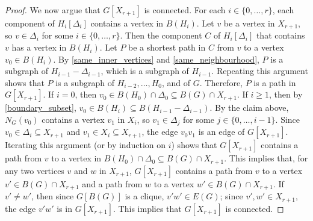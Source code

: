 \documentclass{patmorin}
\begin{document}
\begin{proof}
  We now argue that $G[X_{r+1}]$ is connected.  For each $i\in\{0,\ldots,r\}$, each component of $H_i[\Delta_i]$ contains a vertex in $B(H_i)$. Let $v$ be a vertex in $X_{r+1}$, so $v\in \Delta_i$ for some $i\in\{0,\ldots,r\}$.  Then the component $C$ of $H_i[\Delta_i]$ that contains $v$ has a vertex in $B(H_i)$.  Let $P$ be a shortest path in $C$ from $v$ to a vertex $v_0\in B(H_i)$. By \ref{same_inner_vertices} and \ref{same_neighbourhood}, $P$ is a subgraph of $H_{i-1}-\Delta_{i-1}$, which is a subgraph of $H_{i-1}$. Repeating this argument shows that $P$ is a subgraph of $H_{i-2},\ldots,H_0$, and of $G$.  Therefore, $P$ is a path in $G[X_{r+1}]$.  If $i=0$, then $v_0\in B(H_0)\cap \Delta_0 \subseteq B(G)\cap X_{r+1}$.  If $i\ge 1$, then by \ref{boundary_subset}, $v_0\in B(H_i)\subseteq B(H_{i-1}-\Delta_{i-1})$. By the claim above, $N_G(v_0)$ contains a vertex $v_1$ in $X_i$, so $v_1\in \Delta_j$ for some $j\in\{0,\ldots,i-1\}$. Since $v_0\in\Delta_i\subseteq X_{r+1}$ and $v_1\in X_i\subseteq X_{r+1}$, the edge $v_0v_1$ is an edge of $G[X_{r+1}]$. Iterating this argument (or by induction on $i$) shows that $G[X_{r+1}]$ contains a path from $v$ to a vertex in $B(H_0)\cap \Delta_0 \subseteq B(G)\cap X_{r+1}$.  This implies that, for any two vertices $v$ and $w$ in $X_{r+1}$, $G[X_{r+1}]$ contains a path from $v$ to a vertex $v'\in B(G)\cap X_{r+1}$ and a path from $w$ to a vertex $w'\in B(G)\cap X_{r+1}$.  If $v'\ne w'$, then since $G[B(G)]$ is a clique, $v'w'\in E(G)$; since $v',w'\in X_{r+1}$, the edge $v'w'$ is in $G[X_{r+1}]$. This implies that $G[X_{r+1}]$ is connected.


\end{proof}
\end{document}
